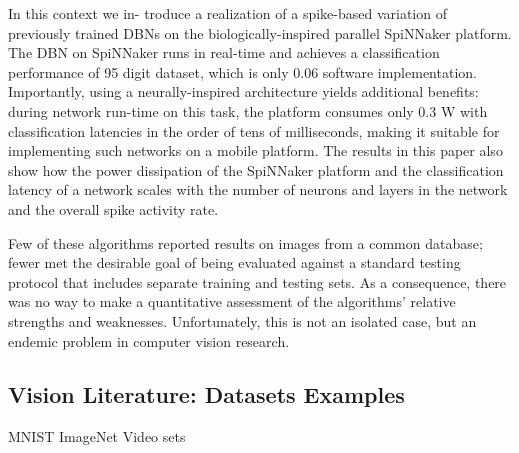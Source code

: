 In  this  context  we  in-
troduce  a  realization  of  a  spike-based  variation  of  previously
trained  DBNs  on  the  biologically-inspired  parallel  SpiNNaker
platform. The DBN on SpiNNaker runs in real-time and achieves
a classification performance of 95%
digit  dataset,  which  is  only  0.06%
software implementation. Importantly, using a neurally-inspired
architecture yields additional benefits: during network run-time
on this task, the platform consumes only 0.3 W with classification
latencies in the order of tens of milliseconds, making it suitable
for  implementing  such  networks  on  a  mobile  platform.  The
results in this paper also show how the power dissipation of the
SpiNNaker platform and the classification latency of a network
scales with the number of neurons and layers in the network and
the overall spike activity rate.


Few of these algorithms reported results on images from a common database; fewer met the desirable goal of being evaluated against a standard testing protocol that includes separate training and testing sets.
As a consequence, there was no way to make a quantitative assessment of the algorithms' relative strengths and weaknesses.
Unfortunately, this is not an isolated case, but an endemic problem in computer vision research.
\subsection{Vision Literature: Datasets Examples}
MNIST
ImageNet
Video sets
